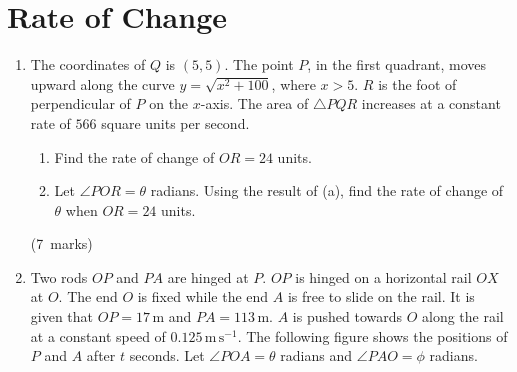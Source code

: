 \documentclass[12pt, a4paper]{article} %
\newcommand{\qmarks}[1]{\leavevmode\unskip\hspace*{\fill}\mbox{(#1 marks)}}
\begin{document}
\section{Rate of Change}
\begin{enumerate}
    \item The coordinates of \(Q\) is \((5,5)\). The point \(P\), in the first quadrant, moves upward along the curve \(\displaystyle y=\sqrt{x^2+100}\), where \(x>5\). \(R\) is the foot of perpendicular of \(P\) on the \(x\)-axis. The area of \(\triangle PQR\) increases at a constant rate of \(566\) square units per second.
    \begin{enumerate}
        \item Find the rate of change of \(OR=24\) units.
        \item Let \(\angle POR=\theta\) radians. Using the result of (a), find the rate of change of \(\theta\) when \(OR=24\) units.
    \end{enumerate} \qmarks{7}

    \item Two rods \(OP\) and \(PA\) are hinged at \(P\). \(OP\) is hinged on a horizontal rail \(OX\) at \(O\). The end \(O\) is fixed while the end \(A\) is free to slide on the rail. It is given that \(OP=17 \mathrm{\,m}\) and \(PA=113\mathrm{\, m}\). \(A\) is pushed towards \(O\) along the rail at a constant speed of \(0.125 \mathrm{\, m\,s}^{-1}\). The following figure shows the positions of \(P\) and \(A\) after \(t\) seconds. Let \(\angle POA=\theta\) radians and \(\angle PAO=\phi \) radians.
    \begin{center}
\end{center}
\end{enumerate}
\end{document}
